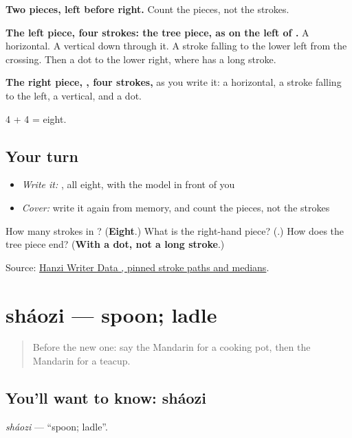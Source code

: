\begin{quote}
\end{quote}

\textbf{Two pieces, left before right.} Count the pieces, not the strokes.

\textbf{The left piece, four strokes: the tree piece, as on the left of .} A horizontal. A vertical down through it. A stroke falling to the lower left from the crossing. Then a dot to the lower right, where  has a long stroke.

\textbf{The right piece, , four strokes,} as you write it: a horizontal, a stroke falling to the left, a vertical, and a dot.

4 + 4 = eight.

\subsection*{Your turn}
\begin{itemize}
\raggedright
  \item \emph{Write it:} , all eight, with the model in front of you
  \item \emph{Cover:} write it again from memory, and count the pieces, not the strokes
\end{itemize}

\begin{tcolorbox}[breakable,colback=teal!4,colframe=teal!35!black,title={Before you move on}]
How many strokes in ? (\textbf{Eight}.) What is the right-hand piece? (\textbf{}.) How does the tree piece end? (\textbf{With a dot, not a long stroke}.)

Source: \href{https://raw.githubusercontent.com/chanind/hanzi-writer-data/68d10a4b21150cae5e1ebbd223eed289cf32d90c/data/\%E6\%9D\%AF.json}{Hanzi Writer Data , pinned stroke paths and medians}.
\end{tcolorbox}
\section[sháozi]{sháozi — spoon; ladle}

\label{lesson:ZH-C170-shaozi}



\begin{quote}
Before the new one: say the Mandarin for a cooking pot, then the Mandarin for a teacup.
\end{quote}

\subsection*{You'll want to know: sháozi}
\emph{sháozi} — \textquotedblleft{}spoon; ladle\textquotedblright{}.

